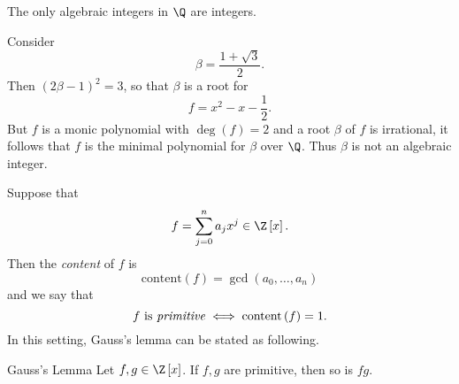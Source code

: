 \documentclass[pmath441]{subfiles}
\begin{document}
    \placeqed[Postponed]

    \begin{cor}{}
        The only algebraic integers in $\Q$ are integers.
    \end{cor}	

    \rruleline

    \begin{example}{}
        Consider
        \begin{equation*}
            \beta = \frac{1+\sqrt{3}}{2}.
        \end{equation*}
        Then $\left( 2\beta-1 \right)^{2}=3$, so that $\beta$ is a root for
        \begin{equation*}
            f = x^{2}-x-\frac{1}{2}.
        \end{equation*}
        But $f$ is a monic polynomial with $\deg\left( f \right)=2$ and a root $\beta$ of $f$ is irrational, it follows that $f$ is the minimal polynomial for $\beta$ over $\Q$. Thus $\beta$ is not an algebraic integer.
    \end{example}

    \rruleline

    \np Suppose that
    \begin{equation*}
        f = \sum^{n}_{j=0} a_jx^j\in\Z\left[ x \right].
    \end{equation*}
    Then the \emph{content} of $f$ is
    \begin{equation*}
        \text{content}\left( f \right) = \gcd\left( a_0,\ldots,a_n \right)
    \end{equation*}
    and we say that
    \begin{equation*}
        \text{$f$ is \emph{primitive}} \iff \text{content}\left( f \right) = 1.
    \end{equation*}
    In this setting, Gauss's lemma can be stated as following.

    \begin{lemma}{Gauss's Lemma}
        Let $f,g\in\Z\left[ x \right]$. If $f,g$ are primitive, then so is $fg$.
    \end{lemma}

    \rruleline
\end{document}
